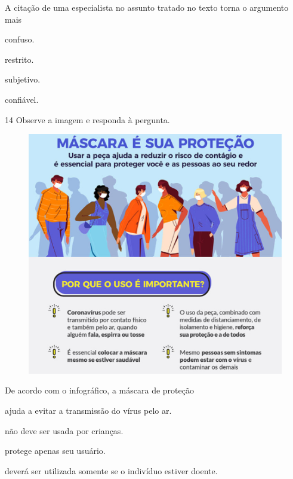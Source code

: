 A citação de uma especialista no assunto tratado no texto torna o
argumento mais

\begin{multicols}{2}
\begin{escolha}
  \item confuso.

  \item restrito.

  \item subjetivo.

  \item confiável.
\end{escolha}
\end{multicols}

\pagebreak

\num{14} Observe a imagem e responda à pergunta.

\begin{figure}[htpb!]
\centering
\includegraphics[width=.9\textwidth]{./imgQ4PORT/media/image2.png}
\end{figure}


De acordo com o infográfico, a máscara de proteção

\begin{escolha}
  \item ajuda a evitar a transmissão do vírus pelo ar.

  \item não deve ser usada por crianças.

  \item protege apenas seu usuário.

  \item deverá ser utilizada somente se o indivíduo estiver doente.
\end{escolha}



